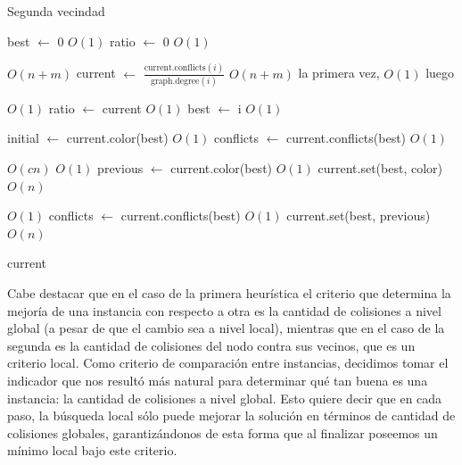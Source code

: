 \documentclass{article}
\theoremstyle{definition}
\theoremstyle{remark}
\begin{document}
\begin{algorithm}[h]
\caption{Segunda vecindad}
\label{ex4:pseudo2}

\begin{algorithmic}
    \State best $\gets$ 0 \Comment $O(1)$
    \State ratio $\gets$ 0 \Comment $O(1)$
    
     \Comment $O(n + m)$
        \State current $\gets$ $\frac{\text{current.conflicts}(i)}{\text{graph.degree}(i)}$ \Comment $O(n + m)$ la primera vez, $O(1)$ luego
        
         \Comment $O(1)$
            \State ratio $\gets$ current \Comment $O(1)$
            \State best $\gets$ i \Comment $O(1)$
        \EndIf
    \EndFor
    
    \State initial $\gets$ current.color(best) \Comment $O(1)$
    \State conflicts $\gets$ current.conflicts(best) \Comment $O(1)$
    
     \Comment $O(cn)$
         \Comment $O(1)$
            \State previous $\gets$ current.color(best) \Comment $O(1)$
            \State current.set(best, color) \Comment $O(n)$
            
             \Comment $O(1)$
                \State conflicts $\gets$ current.conflicts(best) \Comment $O(1)$
            \Else
                \State current.set(best, previous) \Comment $O(n)$
            \EndIf
        \EndIf
    \EndFor
    
    \Return current
\EndFunction
\end{algorithmic}
\end{algorithm}

Cabe destacar que en el caso de la primera heurística el criterio que determina la mejoría de una instancia con respecto a otra es la cantidad de colisiones a nivel global (a pesar de que el cambio sea a nivel local), mientras que en el caso de la segunda es la cantidad de colisiones del nodo contra sus vecinos, que es un criterio local. Como criterio de comparación entre instancias, decidimos tomar el indicador que nos resultó más natural para determinar qué tan buena es una instancia: la cantidad de colisiones a nivel global. Esto quiere decir que en cada paso, la búsqueda local sólo puede mejorar la solución en términos de cantidad de colisiones globales, garantizándonos de esta forma que al finalizar poseemos un mínimo local bajo este criterio.
\end{document}

